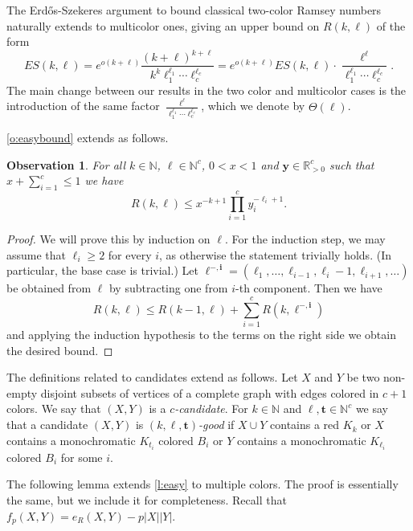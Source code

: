 \documentclass[reqno,final,12pt]{amsart}
\newtheorem{obs}[thm]{Observation}
\newcommand{\bb}[1]{\mathbb{#1}}
\newcommand{\bl}[1]{\boldsymbol{#1}}
\begin{document}
The Erd\H{o}s-Szekeres argument to bound classical two-color Ramsey numbers naturally extends to multicolor ones, giving an upper bound on $R(k,\bl{\ell})$ of the form $$ES(k,\bl{\ell}) = e^{o(k+\ell)}\frac{(k+\ell)^{k+\ell}}{k^k \ell_1^{\ell_1}\cdots\ell_c^{\ell_c}} =  e^{o(k+\ell)} ES(k,\ell)\cdot \frac{\ell^{\ell}}{\ell_1^{\ell_1}\cdots\ell_c^{\ell_c}}.$$
The main change between our results in the two color and multicolor cases is the introduction of the same factor  $\frac{\ell^{\ell}}{\ell_1^{\ell_1}\cdots\ell_c^{\ell_c}}$, which we denote by $\Theta(\bl{\ell})$.

\cref{o:easybound} extends as follows.

\begin{obs}\label{o:easybound2} For all  $k \in \bb{N}$, $\bl{\ell}\in \bb{N}^c$, $0< x < 1$ and $\bl{y}\in \bb{R}_{>0}^c$ such that $x+ \sum_{i=1}^c \leq 1$  we have
	$$R(k,\bl{\ell}) \leq x^{-k+1}\prod_{i=1}^{c}y_i^{-\ell_i+1}.$$	
\end{obs}
\begin{proof}
	We will prove this by induction on $\ell$.
	For the induction step, we may assume that $\ell_i \geq 2$ for every $i$, as otherwise the statement trivially holds. (In particular, the base case is trivial.) Let $\bl{\ell^{-,i}}=(\ell_1,\ldots,\ell_{i-1},\ell_{i}-1,\ell_{i+1},\ldots)$ be obtained from $\bl{\ell}$ by subtracting one from $i$-th component. Then we have $$ R(k,\bl{\ell})\leq R(k-1,\bl{\ell}) + \sum_{i=1}^{c}R(k,\bl{\ell^{-,i}})$$
and	applying the induction hypothesis to the terms on the right side we obtain the desired bound. 
\end{proof}

The definitions related to candidates extend as follows.
Let $X$ and $Y$ be two non-empty disjoint subsets of vertices  of a complete graph with edges colored in $c+1$ colors.  We say that $(X,Y)$ is a \emph{$c$-candidate}. For $k \in \bb{N}$ and $\bl{\ell},\bl{t} \in \bb{N}^c$ 
we say that a candidate $(X,Y)$ is \emph{$(k,\bl{\ell},\bl{t})$-good} if $X \cup Y$ contains a red $K_k$ or $X$ contains a monochromatic $K_{t_i}$ colored $B_i$ or $Y$ contains a monochromatic $K_{\ell_i}$ colored $B_i$ for some $i$.  

The following lemma extends \cref{l:easy} to multiple colors. The proof is essentially the same, but we include it for completeness. Recall that  $f_{p}(X,Y)=e_R(X,Y) - p|X||Y|$.
\end{document}
